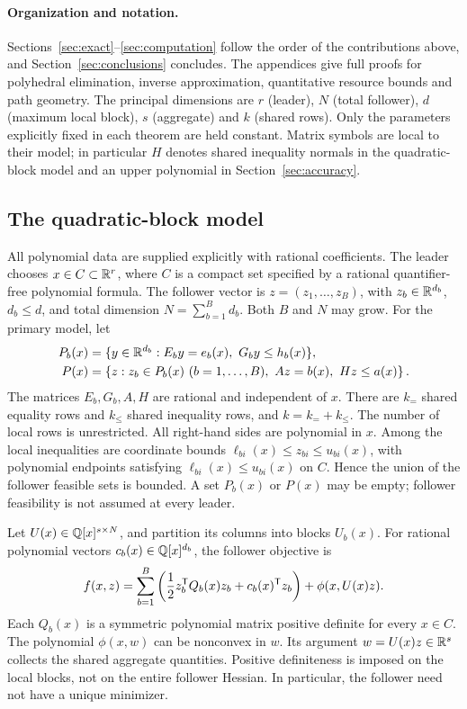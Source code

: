\paragraph{Organization and notation.}
Sections~\ref{sec:exact}--\ref{sec:computation} follow the order of the
contributions above, and Section~\ref{sec:conclusions} concludes. The
appendices give full proofs for polyhedral elimination, inverse
approximation, quantitative resource bounds and path geometry. The principal
dimensions are $r$ (leader), $N$ (total follower), $d$ (maximum local
block), $s$ (aggregate) and $k$ (shared rows). Only the parameters
explicitly fixed in each theorem are held constant. Matrix symbols are local
to their model; in particular $H$ denotes shared inequality normals in the
quadratic-block model and an upper polynomial in Section~\ref{sec:accuracy}.

\subsection{The quadratic-block model}\label{subsec:model}

All polynomial data are supplied explicitly with rational coefficients.
The leader chooses $x\in C\subset\mathbb R^r$, where $C$ is a compact set
specified by a rational quantifier-free polynomial formula. The follower
vector is $z=(z_1,\ldots,z_B)$, with $z_b\in\mathbb R^{d_b}$,
$d_b\le d$, and total dimension $N=\sum_{b=1}^B d_b$. Both $B$ and $N$
may grow. For the primary model, let
\begin{align}
 P_b(x)&=\{y\in\mathbb R^{d_b}:E_b y=e_b(x),\ G_b y\le h_b(x)\},
 \label{eq:local-polytope}\\
 P(x)&=\left\{z:z_b\in P_b(x)\ (b=1,\ldots,B),\
                     Az=b(x),\ Hz\le a(x)\right\}.
 \label{eq:follower-polytope}
\end{align}
The matrices $E_b,G_b,A,H$ are rational and independent of $x$.
There are $k_{=}$ shared equality rows and $k_{\le}$ shared inequality
rows, and $k=k_=+k_{\le}$. The number of local rows is unrestricted.
All right-hand sides are polynomial in $x$. Among the local inequalities
are coordinate bounds
$\ell_{bi}(x)\le z_{bi}\le u_{bi}(x)$, with polynomial endpoints
satisfying $\ell_{bi}(x)\le u_{bi}(x)$ on $C$.
Hence the union of the follower feasible sets is bounded.
A set $P_b(x)$ or $P(x)$ may be empty; follower feasibility is not
assumed at every leader.

Let $U(x)\in\mathbb Q[x]^{s\times N}$, and partition its columns into blocks
$U_b(x)$. For rational polynomial vectors $c_b(x)\in\mathbb Q[x]^{d_b}$,
the follower objective is
\begin{equation}\label{eq:quadratic-objective}
 f(x,z)=\sum_{b=1}^B\left(\frac12 z_b^{\mathsf T} Q_b(x)z_b+
                c_b(x)^{\mathsf T} z_b\right)+\phi(x,U(x)z).
\end{equation}
Each $Q_b(x)$ is a symmetric polynomial matrix positive definite for
every $x\in C$. The polynomial $\phi(x,w)$ can be nonconvex in $w$.
Its argument $w=U(x)z\in\mathbb R^s$ collects the shared aggregate quantities.
Positive definiteness is imposed on the local blocks, not on the entire
follower Hessian. In particular, the follower need not have a unique
minimizer.

